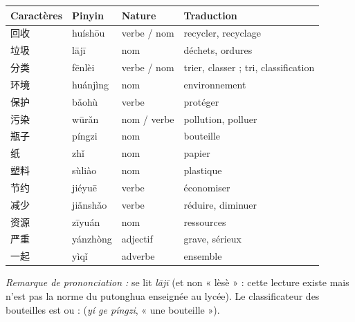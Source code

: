 \documentclass[11pt]{article}
\newcommand{\zh}[1]{\ifmmode\text{#1}\else{#1}\fi}
\begin{document}
\begin{definition}
\begin{center}
\begin{tabularx}{\linewidth}{|X|X|X|X|}
\hline
\rowcolor{popblueL} Caractères & Pinyin & Nature & Traduction \\
\hline
回收 & huíshōu & verbe / nom & recycler, recyclage \\
\hline
垃圾 & lājī & nom & déchets, ordures \\
\hline
分类 & fēnlèi & verbe / nom & trier, classer ; tri, classification \\
\hline
环境 & huánjìng & nom & environnement \\
\hline
保护 & bǎohù & verbe & protéger \\
\hline
污染 & wūrǎn & nom / verbe & pollution, polluer \\
\hline
瓶子 & píngzi & nom & bouteille \\
\hline
纸 & zhǐ & nom & papier \\
\hline
塑料 & sùliào & nom & plastique \\
\hline
节约 & jiéyuē & verbe & économiser \\
\hline
减少 & jiǎnshǎo & verbe & réduire, diminuer \\
\hline
资源 & zīyuán & nom & ressources \\
\hline
严重 & yánzhòng & adjectif & grave, sérieux \\
\hline
一起 & yìqǐ & adverbe & ensemble \\
\hline
\end{tabularx}
\end{center}
\emph{Remarque de prononciation :} \zh{垃圾} se lit \emph{lājī} (et non « lèsè » : cette lecture existe mais n'est pas la norme du putonghua enseignée au lycée). Le classificateur des bouteilles est \zh{个} ou \zh{只} : \zh{一个瓶子} (\emph{yí ge píngzi}, « une bouteille »).
\end{definition}
\end{document}
